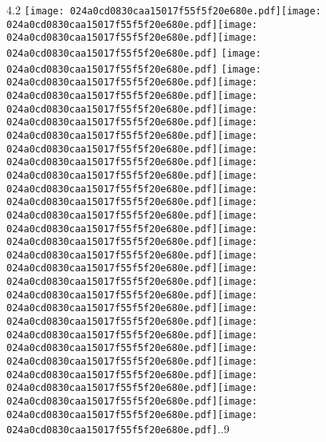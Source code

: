 \documentclass{article}
\newcommand{\origpg}[2]{\texttt{[image: 024a0cd0830caa15017f55f5f20e680e.pdf]}}
\begin{document}
{\vspace{0.626pt}\hspace{36.161pt}4.2 \origpg2{145.79pt 488.2pt 157.22pt 504.34pt}\hspace{-2.276pt}\origpg2{154.95pt 488.2pt 163.16pt 504.34pt}\hspace{-0.258pt}\origpg2{162.9pt 488.2pt 170.07pt 504.34pt}\origpg2{170.12pt 488.2pt 178.19pt 504.34pt} \origpg2{182.19pt 488.2pt 190.26pt 504.34pt} \origpg2{194.24pt 488.2pt 201.29pt 504.34pt}\origpg2{201.22pt 488.2pt 208.39pt 504.34pt}\hspace{-0.178pt}\origpg2{208.21pt 488.2pt 216.28pt 504.34pt}\hspace{-0.113pt}\origpg2{216.17pt 488.2pt 226.39pt 504.34pt}\hspace{-0.339pt}\origpg2{226.05pt 488.2pt 233.21pt 504.34pt}\hspace{0.291pt}\origpg2{233.51pt 488.2pt 241.56pt 504.34pt}\origpg2{241.46pt 488.2pt 250.1pt 504.34pt}\origpg2{250.1pt 488.2pt 256.47pt 504.34pt}\origpg2{256.39pt 488.2pt 263.56pt 504.34pt}\origpg2{263.61pt 488.2pt 272.24pt 504.34pt}\hspace{-0.21pt}\origpg2{272.03pt 488.2pt 280.67pt 504.34pt}\origpg2{280.67pt 488.2pt 288.09pt 504.34pt}\hspace{0.145pt}\origpg2{288.24pt 488.2pt 304.38pt 504.34pt}\hspace{-0.242pt}\origpg2{304.14pt 488.2pt 320.28pt 504.34pt}\origpg2{320.28pt 488.2pt 336.42pt 504.34pt}\origpg2{336.42pt 488.2pt 352.56pt 504.34pt}\hspace{-0.242pt}\origpg2{352.31pt 488.2pt 368.45pt 504.34pt}\origpg2{368.45pt 488.2pt 384.59pt 504.34pt}\origpg2{384.59pt 488.2pt 400.73pt 504.34pt}\origpg2{400.73pt 488.2pt 416.88pt 504.34pt}\hspace{-0.242pt}\origpg2{416.63pt 488.2pt 432.77pt 504.34pt}\origpg2{432.77pt 488.2pt 448.91pt 504.34pt}\origpg2{448.91pt 488.2pt 465.05pt 504.34pt}\hspace{-0.242pt}\origpg2{464.81pt 488.2pt 480.95pt 504.34pt}\origpg2{480.95pt 488.2pt 497.09pt 504.34pt}\origpg2{497.09pt 488.2pt 513.23pt 504.34pt}\hspace{-0.242pt}\origpg2{512.99pt 488.2pt 529.13pt 504.34pt}..9 

}
\end{document}
